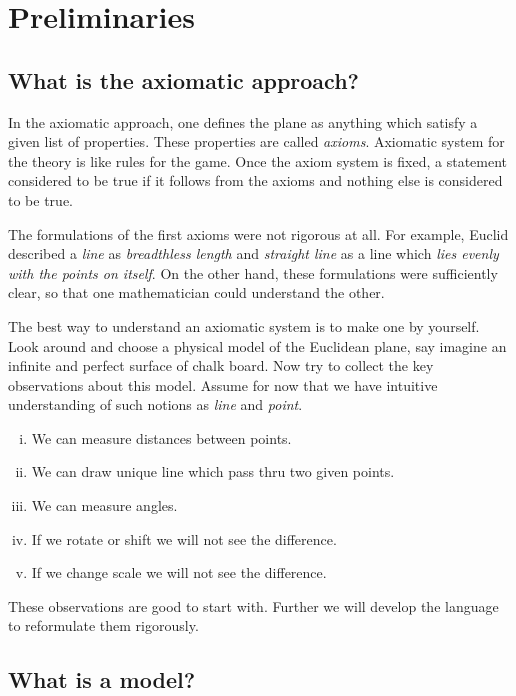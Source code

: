 \chapter{Preliminaries}\label{chap:metr}

\section*{What is the axiomatic approach?}

In the axiomatic approach,
one defines the plane as anything which satisfy 
a given list of properties.
These properties are called {}\emph{axioms}.
Axiomatic system for the theory 
is like rules for the game.
Once the axiom system is fixed, a statement considered to be true if it follows from the axioms and nothing else is considered to be true.

The formulations of the first axioms were not rigorous at all.
For example, Euclid described a {}\emph{line} as {}\emph{breadthless length}
and {}\emph{straight line} as a line which {}\emph{lies evenly with the points on itself}.
On the other hand,
these formulations were sufficiently clear, 
so that one mathematician could understand the other.

The best way to understand an axiomatic system
is to make one by yourself.
Look around and choose a physical model 
of the Euclidean plane, 
say imagine an infinite and perfect surface of chalk board. 
Now try to collect the key observations
about this model.
Assume for now that we have intuitive understanding of such notions as {}\emph{line} and {}\emph{point}.
\begin{enumerate}[(i)]
 \item\label{preaxiomI} We can measure distances between points.
 \item\label{preaxiomII} We can draw unique line 
 which pass thru two given points.
 \item\label{preaxiomIII} We can measure angles.
 \item\label{preaxiomIV} If we rotate or shift we will not see the difference.
 \item\label{preaxiomV} If we change scale we will not see the difference.
\end{enumerate}
These observations are good to start with.
Further we will develop the language
to reformulate them rigorously.

\section*{What is a model?}

